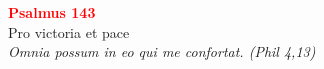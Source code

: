 


\def\greinitialformat#1{%
{\fontsize{39}{39}\selectfont #1}%
}




\vspace{0.3cm}
\begin{center}
 \textcolor{red}{\large \bf Psalmus 143}\\
Pro victoria et pace\\
\textit{\small Omnia possum in eo qui me confortat. (Phil 4,13)}
\end{center}
